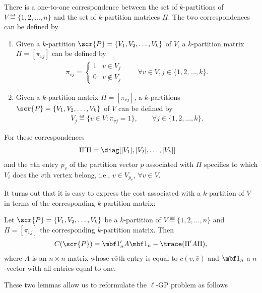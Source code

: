\documentclass[10pt]{article}
\begin{document}
\begin{lemma}\label{le:partition-matrix}
  There is a one-to-one correspondence between the set of
  $k$-partitions of $V\eqdef\{1,2,\dots,n\}$ and the set of
  $k$-partition matrices $\Pi$. The two correspondences can be defined
  by
  \begin{enumerate}
  \item Given a $k$-partition $\scr{P}=\{V_1,V_2,\dots,V_k\}$ of $V$,
    a $k$-partition matrix $\Pi=[\pi_{v j}]$ can be defined by
    \begin{align}\label{eq:pi-v}
      \pi_{v j}=\begin{cases}
        1 & v\in V_j\\
        0 & v\notin V_j
      \end{cases}
      \qquad \forall v\in V, j\in\{1,2,\dots,k\}.
    \end{align}

  \item Given a $k$-partition matrix $\Pi=[\pi_{v j}]$, a $k$-partitions
    $\scr{P}=\{V_1,V_2,\dots,V_k\}$ of $V$ can be defined by
    \begin{align}\label{eq:v-pi}
      V_j\eqdef \{ v\in V:\pi_{v j}=1 \}, \qquad \forall j\in\{1,2,\dots,k\}.
    \end{align}
  \end{enumerate}
  For these correspondences 
  \begin{align*}
    \Pi'\Pi&=\diag[ |V_1|,|V_2|, \dots, |V_k| ]
  \end{align*}
  and the $v$th entry $p_v$ of the partition vector $p$ associated
  with $\Pi$ specifies to which $V_i$ does the $v$th vertex belong,
  i.e., $v\in V_{p_v}$, $\forall v\in V$.\frqed
\end{lemma}
It turns out that it is easy to express the cost associated with a
$k$-partition of $V$  in terms of the corresponding $k$-partition
matrix:
\begin{lemma}\label{le:c-matrix}
  Let $\scr{P}=\{V_1,V_2,\dots,V_k\}$ be a $k$-partition of
  $V\eqdef\{1,2,\dots,n\}$ and $\Pi=[\pi_{v j}]$ the corresponding
  $k$-partition matrix. Then
  \begin{align*}
    C(\scr{P})=\mbf 1_n' A \mbf 1_n-\trace(\Pi'A \Pi),
  \end{align*}
  where $A$ is an $n\times n$ matrix whose $v \bar v$th entry is equal to
  $c(v,\bar v)$ and $\mbf 1_n$ a $n$-vector with all entries equal to one.\frqed
\end{lemma}
These two lemmas allow us to reformulate the $\ell$-GP problem as follows
\end{document}
